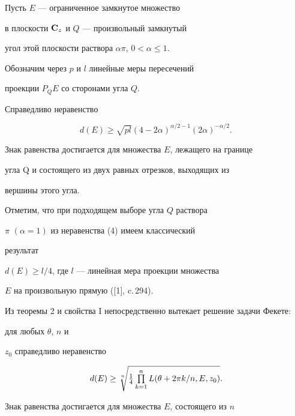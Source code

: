 \begin{thm} Пусть $E$ --- ограниченное замкнутое множество


в плоскости ${\bold C}_z$ и $Q$ --- произвольный замкнутый 


угол этой плоскости раствора $\alpha \pi$, $0<\alpha\leq 1$.


Обозначим через $p$  и $l$  линейные меры пересечений


проекции $P_QE$ со сторонами угла $Q$.


Справедливо неравенство    


\begin{equation}


d(E)\geq \sqrt{pl}(4-2\alpha)^{\alpha/2 -1}


(2\alpha)^{-\alpha/2}.


\end{equation}


Знак равенства достигается для множества $E$, лежащего на границе


угла Q и состоящего из двух равных отрезков, выходящих из


вершины этого угла.


\end{thm}





Отметим, что при подходящем выборе угла $Q$ раствора


$\pi$ $(\alpha =1)$ из неравенства (4) имеем классический


результат


$d(E)\geq l/4$, где $l$ --- линейная мера проекции множества


$E$ на произвольную прямую ([1], c.\,294).  





Из теоремы 2 и свойства I непосредственно вытекает решение задачи Фекете:


для любых $\theta$, $n$ и


$z_0$ справедливо неравенство


\begin{equation}


d(E)\geq\sqrt[\uproot{2}n]


{\textstyle\frac{1}{4}\prod\limits^n_{k=1}L(\theta+2\pi k/n, E,z_0)}.


\end{equation}


Знак равенства достигается для множества $E$, состоящего из $n$


